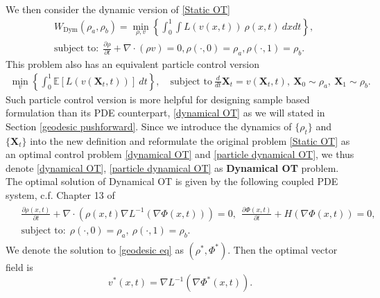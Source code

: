 \documentclass{article}
\begin{document}
We then consider the dynamic version of \eqref{Static OT}
\begin{align}
    & W_{\textrm{Dym}}(\rho_a,\rho_b) = \min_{\rho,{v}}\left\{ \int_0^1\int L({v}(x,t))~\rho(x,t)~dxdt  \right\}, \label{dynamical OT}\\
    & \textrm{subject to:}~~\frac{\partial\rho}{\partial t} + \nabla\cdot(\rho{v}) = 0, \rho(\cdot, 0)=\rho_a, \rho(\cdot,1) = \rho_b.  \label{constraints}
\end{align}
This problem also has an equivalent particle control version %
\begin{align}
  \min_{{v}}\left\{ \int_0^1\mathbb{E} [L({v}(\boldsymbol{X}_t,t))]~dt  \right\}, \label{particle dynamical OT} \quad
  \textrm{subject to}~ \frac{d}{dt}\boldsymbol{X}_t = {v}(\boldsymbol{X}_t, t),~ \boldsymbol{X}_0 \sim \rho_a, ~ \boldsymbol{X}_1 \sim \rho_b. %
\end{align}
Such particle control version is more helpful for designing sample based formulation than its PDE counterpart, \eqref{dynamical OT} as we will stated in Section \ref{geodesic pushforward}.
Since we introduce the dynamics of $\{\rho_t\}$ and $\{\boldsymbol{X}_t\}$ into the new definition and reformulate the original problem \eqref{Static OT} as an optimal control problem \eqref{dynamical OT} and \eqref{particle dynamical OT}, we thus denote \eqref{dynamical OT}, \eqref{particle dynamical OT} as \textbf{Dynamical OT} problem. The optimal solution of Dynamical OT is given by the following coupled PDE system, c.f. Chapter 13 of \cite{villani2008optimal}
\begin{align}
\label{geodesic eq}
\begin{split}
  &\frac{\partial \rho(x,t)}{\partial t} + \nabla\cdot(\rho(x,t) \nabla L^{-1}(\nabla \Phi(x,t)))=0,~~\frac{\partial \Phi(x,t)}{\partial t} + H(\nabla \Phi(x,t)) = 0 ,  \\
  &\textrm{subject to:}~~\rho(\cdot,0) = \rho_a, ~\rho(\cdot, 1) = \rho_b.
\end{split}
\end{align}
We denote the solution to \eqref{geodesic eq} as $(\rho^*, \Phi^*)$. Then the optimal vector field is
\begin{equation}
  {v}^*(x,t) = \nabla L^{-1}(\nabla\Phi^*(x, t)). \label{vector field = inv grad L grad Phi}
\end{equation}
\end{document}

